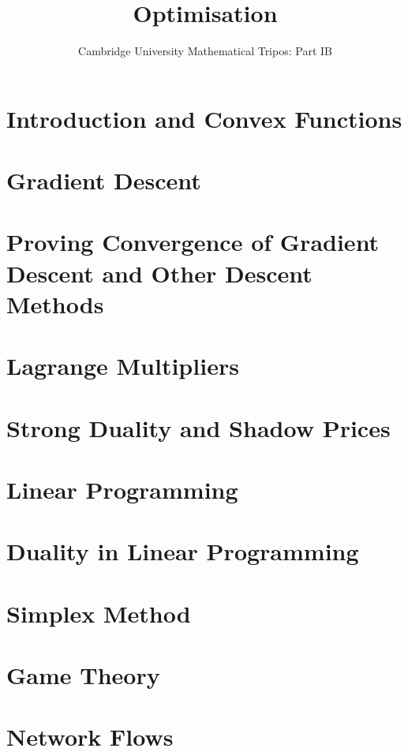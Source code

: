 \documentclass{article}
\title{Optimisation}
\author{Cambridge University Mathematical Tripos: Part IB}
\begin{document}
\maketitle

\tableofcontentsnewpage{}

\section{Introduction and Convex Functions}

\section{Gradient Descent}

\section{Proving Convergence of Gradient Descent and Other Descent Methods}

\section{Lagrange Multipliers}

\section{Strong Duality and Shadow Prices}

\section{Linear Programming}

\section{Duality in Linear Programming}

\section{Simplex Method}

\section{Game Theory}

\section{Network Flows}

\end{document}
